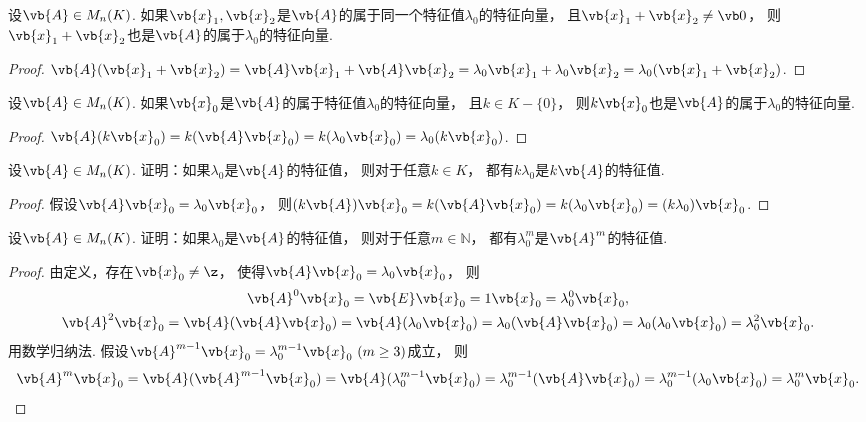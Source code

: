 \begin{proposition}\label{theorem:矩阵的特征值与特征向量.特征子空间1}
设\(\vb{A} \in M_n(K)\).
如果\(\vb{x}_1,\vb{x}_2\)是\(\vb{A}\)的属于同一个特征值\(\lambda_0\)的特征向量，
且\(\vb{x}_1 + \vb{x}_2 \neq \vb0\)，
则\(\vb{x}_1 + \vb{x}_2\)也是\(\vb{A}\)的属于\(\lambda_0\)的特征向量.
\begin{proof}
\(\vb{A} (\vb{x}_1 + \vb{x}_2)
= \vb{A} \vb{x}_1 + \vb{A} \vb{x}_2
= \lambda_0 \vb{x}_1 + \lambda_0 \vb{x}_2
= \lambda_0 (\vb{x}_1 + \vb{x}_2)\).
\end{proof}
\end{proposition}
\begin{proposition}\label{theorem:矩阵的特征值与特征向量.特征子空间2}
设\(\vb{A} \in M_n(K)\).
如果\(\vb{x}_0\)是\(\vb{A}\)的属于特征值\(\lambda_0\)的特征向量，
且\(k \in K-\{0\}\)，
则\(k \vb{x}_0\)也是\(\vb{A}\)的属于\(\lambda_0\)的特征向量.
\begin{proof}
\(\vb{A} (k \vb{x}_0)
= k (\vb{A} \vb{x}_0)
= k (\lambda_0 \vb{x}_0)
= \lambda_0 (k \vb{x}_0)\).
\end{proof}
\end{proposition}
\begin{example}\label{example:矩阵的特征值与特征向量.矩阵的多项式的特征值1}
设\(\vb{A} \in M_n(K)\).
证明：如果\(\lambda_0\)是\(\vb{A}\)的特征值，
则对于任意\(k \in K\)，
都有\(k\lambda_0\)是\(k\vb{A}\)的特征值.
\begin{proof}
假设\(\vb{A} \vb{x}_0 = \lambda_0 \vb{x}_0\)，
则\((k\vb{A}) \vb{x}_0
= k(\vb{A} \vb{x}_0)
= k(\lambda_0 \vb{x}_0)
= (k\lambda_0) \vb{x}_0\).
\end{proof}
\end{example}
\begin{example}\label{example:矩阵的特征值与特征向量.矩阵的多项式的特征值2}
设\(\vb{A} \in M_n(K)\).
证明：如果\(\lambda_0\)是\(\vb{A}\)的特征值，
则对于任意\(m\in\mathbb{N}\)，
都有\(\lambda_0^m\)是\(\vb{A}^m\)的特征值.
\begin{proof}
由定义，存在\(\vb{x}_0\neq\z\)，
使得\(\vb{A}\vb{x}_0 = \lambda_0\vb{x}_0\)，
则\begin{gather*}
	\vb{A}^0 \vb{x}_0
	= \vb{E} \vb{x}_0
	= 1 \vb{x}_0
	= \lambda_0^0 \vb{x}_0, \\
	\vb{A}^2\vb{x}_0 = \vb{A}(\vb{A}\vb{x}_0)
	= \vb{A}(\lambda_0\vb{x}_0)
	= \lambda_0(\vb{A}\vb{x}_0)
	= \lambda_0(\lambda_0\vb{x}_0)
	= \lambda_0^2\vb{x}_0.
\end{gather*}
用数学归纳法.
假设\(\vb{A}^{m-1}\vb{x}_0 = \lambda_0^{m-1}\vb{x}_0\ (m\geq3)\)成立，
则\[
	\vb{A}^m\vb{x}_0 = \vb{A}(\vb{A}^{m-1}\vb{x}_0)
	= \vb{A}(\lambda_0^{m-1}\vb{x}_0)
	= \lambda_0^{m-1}(\vb{A}\vb{x}_0)
	= \lambda_0^{m-1}(\lambda_0\vb{x}_0)
	= \lambda_0^m\vb{x}_0.
	\qedhere
\]
\end{proof}
\end{example}
